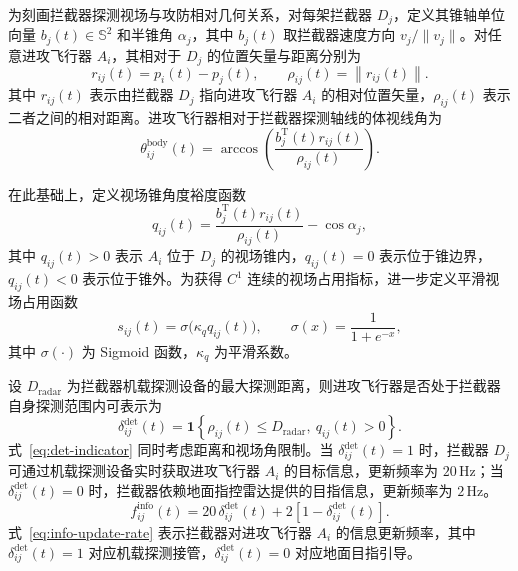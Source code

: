 为刻画拦截器探测视场与攻防相对几何关系，对每架拦截器 $D_j$，定义其锥轴单位向量 $b_j(t)\in\mathbb S^2$ 和半锥角 $\alpha_j$，其中 $b_j(t)$ 取拦截器速度方向 $v_j/\|v_j\|$。对任意进攻飞行器 $A_i$，其相对于 $D_j$ 的位置矢量与距离分别为
\begin{equation}
r_{ij}(t)=p_i(t)-p_j(t),\qquad
\rho_{ij}(t)=\left\|r_{ij}(t)\right\|.
\end{equation}
其中 $r_{ij}(t)$ 表示由拦截器 $D_j$ 指向进攻飞行器 $A_i$ 的相对位置矢量，$\rho_{ij}(t)$ 表示二者之间的相对距离。进攻飞行器相对于拦截器探测轴线的体视线角为
\begin{equation}
\theta_{ij}^{\mathrm{body}}(t)
=
\arccos
\left(
\frac{b_j^{\mathrm T}(t)r_{ij}(t)}
{\rho_{ij}(t)}
\right).
\end{equation}

在此基础上，定义视场锥角度裕度函数
\begin{equation}
q_{ij}(t)
=
\frac{b_j^{\mathrm T}(t)r_{ij}(t)}
{\rho_{ij}(t)}
-\cos\alpha_j ,
\label{eq:qij-def}
\end{equation}
其中 $q_{ij}(t)>0$ 表示 $A_i$ 位于 $D_j$ 的视场锥内，$q_{ij}(t)=0$ 表示位于锥边界，$q_{ij}(t)<0$ 表示位于锥外。为获得 $C^1$ 连续的视场占用指标，进一步定义平滑视场占用函数
\begin{equation}
s_{ij}(t)
=
\sigma\!\bigl(\kappa_q q_{ij}(t)\bigr),\qquad
\sigma(x)=\frac{1}{1+e^{-x}},
\label{eq:sij-def}
\end{equation}
其中 $\sigma(\cdot)$ 为 Sigmoid 函数，$\kappa_q$ 为平滑系数。

设 $D_{\mathrm{radar}}$ 为拦截器机载探测设备的最大探测距离，则进攻飞行器是否处于拦截器自身探测范围内可表示为
\begin{equation}
\delta_{ij}^{\mathrm{det}}(t)
=
\mathbf{1}
\left\{
\rho_{ij}(t)\le D_{\mathrm{radar}},\
q_{ij}(t)>0
\right\}.
\label{eq:det-indicator}
\end{equation}
式~\eqref{eq:det-indicator} 同时考虑距离和视场角限制。当 $\delta_{ij}^{\mathrm{det}}(t)=1$ 时，拦截器 $D_j$ 可通过机载探测设备实时获取进攻飞行器 $A_i$ 的目标信息，更新频率为 $20\,\mathrm{Hz}$；当 $\delta_{ij}^{\mathrm{det}}(t)=0$ 时，拦截器依赖地面指控雷达提供的目指信息，更新频率为 $2\,\mathrm{Hz}$。
\begin{equation}
f_{ij}^{\mathrm{info}}(t)
=
20\,\delta_{ij}^{\mathrm{det}}(t)
+
2\left[1-\delta_{ij}^{\mathrm{det}}(t)\right].
\label{eq:info-update-rate}
\end{equation}
式~\eqref{eq:info-update-rate} 表示拦截器对进攻飞行器 $A_i$ 的信息更新频率，其中 $\delta_{ij}^{\mathrm{det}}(t)=1$ 对应机载探测接管，$\delta_{ij}^{\mathrm{det}}(t)=0$ 对应地面目指引导。


